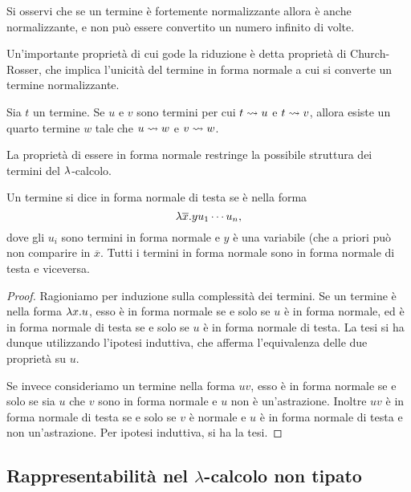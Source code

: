 \documentclass[]{marticle}
\begin{document}
Si osservi che se un termine \`e fortemente normalizzante allora \`e anche
normalizzante, e non pu\`o essere convertito un numero infinito di volte.


Un'importante propriet\`a di cui gode la riduzione \`e detta propriet\`a di
Church-Rosser, che implica l'unicit\`a del termine in forma normale a cui si
converte un termine normalizzante.

\begin{block}[Teorema]
    Sia $t$ un termine. Se $u$ e $v$ sono termini per cui $t\rightsquigarrow u$ e $t\rightsquigarrow
    v$, allora esiste un quarto termine $w$ tale che $u\rightsquigarrow w$ e $v\rightsquigarrow w$.
\end{block}

La propriet\`a di essere in forma normale restringe la possibile struttura dei
termini del $\lambda$-calcolo.

\begin{block}[Proposizione]
    Un termine si dice in forma normale di testa se \`e nella forma
    \[
        \lambda \overline{x}.yu_1\cdots u_n,
    \]
    dove gli $u_i$ sono termini in forma normale e $y$ \`e una variabile (che a
    priori pu\`o non comparire in $\overline{x}$. Tutti i termini in forma
    normale sono in forma normale di testa e viceversa.
\end{block}

\begin{proof}
    Ragioniamo per induzione sulla complessit\`a dei termini. Se un termine \`e
    nella forma $\lambda x.u$, esso \`e in forma normale se e solo se $u$ \`e in
    forma normale, ed \`e in forma normale di testa se e solo se $u$ \`e in
    forma normale di testa. La tesi si ha dunque utilizzando l'ipotesi
    induttiva, che afferma l'equivalenza delle due propriet\`a su $u$. 

    Se invece consideriamo un termine nella forma $uv$, esso \`e in forma
    normale se e solo se sia $u$ che $v$ sono in forma normale e $u$ non \`e
    un'astrazione. Inoltre $uv$ \`e in forma normale di testa se e solo se $v$
    \`e normale e $u$ \`e in forma normale di testa e non un'astrazione. Per
    ipotesi induttiva, si ha la tesi.
\end{proof}

\subsection{Rappresentabilit\`a nel $\lambda$-calcolo non tipato}
\end{document}

